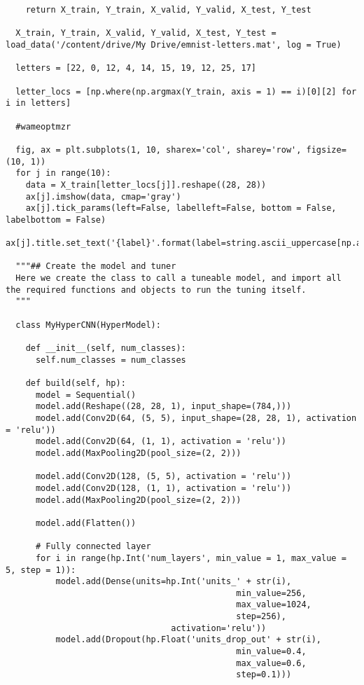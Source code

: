 \documentclass[12pt]{article}
\numberwithin{equation}{section}
\numberwithin{figure}{section}
\numberwithin{table}{section}
\begin{document}
\begin{lstlisting}
    return X_train, Y_train, X_valid, Y_valid, X_test, Y_test
  
  X_train, Y_train, X_valid, Y_valid, X_test, Y_test =  load_data('/content/drive/My Drive/emnist-letters.mat', log = True)
  
  letters = [22, 0, 12, 4, 14, 15, 19, 12, 25, 17]
  
  letter_locs = [np.where(np.argmax(Y_train, axis = 1) == i)[0][2] for i in letters]
  
  #wameoptmzr
  
  fig, ax = plt.subplots(1, 10, sharex='col', sharey='row', figsize=(10, 1))
  for j in range(10):
    data = X_train[letter_locs[j]].reshape((28, 28))
    ax[j].imshow(data, cmap='gray')
    ax[j].tick_params(left=False, labelleft=False, bottom = False, labelbottom = False)
    ax[j].title.set_text('{label}'.format(label=string.ascii_uppercase[np.argmax(Y_train[letter_locs[j]])]))
  
  """## Create the model and tuner
  Here we create the class to call a tuneable model, and import all the required functions and objects to run the tuning itself.
  """
  
  class MyHyperCNN(HyperModel):
  
    def __init__(self, num_classes):
      self.num_classes = num_classes
  
    def build(self, hp):
      model = Sequential()
      model.add(Reshape((28, 28, 1), input_shape=(784,)))
      model.add(Conv2D(64, (5, 5), input_shape=(28, 28, 1), activation = 'relu'))
      model.add(Conv2D(64, (1, 1), activation = 'relu'))
      model.add(MaxPooling2D(pool_size=(2, 2)))
  
      model.add(Conv2D(128, (5, 5), activation = 'relu'))
      model.add(Conv2D(128, (1, 1), activation = 'relu'))
      model.add(MaxPooling2D(pool_size=(2, 2)))
  
      model.add(Flatten())
  
      # Fully connected layer
      for i in range(hp.Int('num_layers', min_value = 1, max_value = 5, step = 1)):
          model.add(Dense(units=hp.Int('units_' + str(i),
                                              min_value=256,
                                              max_value=1024,
                                              step=256),
                                 activation='relu'))
          model.add(Dropout(hp.Float('units_drop_out' + str(i),
                                              min_value=0.4,
                                              max_value=0.6,
                                              step=0.1)))
  

\end{lstlisting}
\end{document}
